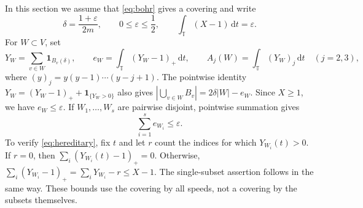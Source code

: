 \documentclass[12pt,leqno]{article}
\numberwithin{equation}{section}
\theoremstyle{remark}
\newcommand{\LRtorus}{\mathbb T}
\newcommand{\LRindicator}{\mathbf 1}
\newcommand{\LRdifferential}{\,\mathrm d}
\begin{document}
In this section we assume that \eqref{eq:bohr} gives a covering and write
\begin{equation}\label{eq:epsilon}
\delta=\frac{1+\varepsilon}{2m},\qquad
0\le\varepsilon\le\frac12,\qquad
\int_\LRtorus(X-1)\LRdifferential t=\varepsilon.
\end{equation}
For $W\subset V$, set
\[
Y_W=\sum_{v\in W}\LRindicator_{B_v(\delta)},\qquad
e_W=\int_\LRtorus(Y_W-1)_+\LRdifferential t,
\qquad A_j(W)=\int_\LRtorus(Y_W)_j\LRdifferential t\quad(j=2,3),
\]
where $(y)_j=y(y-1)\cdots(y-j+1)$. The pointwise identity $Y_W=(Y_W-1)_++\LRindicator_{\{Y_W>0\}}$ also gives $|\bigcup_{v\in W}B_v|=2\delta|W|-e_W$. Since $X\ge1$, we have $e_W\le\varepsilon$. If $W_1,\ldots,W_s$ are pairwise disjoint, pointwise summation gives
\begin{equation}\label{eq:hereditary}
\sum_{i=1}^s e_{W_i}\le\varepsilon.
\end{equation}
To verify \eqref{eq:hereditary}, fix $t$ and let $r$ count the indices for which $Y_{W_i}(t)>0$. If $r=0$, then $\sum_i(Y_{W_i}(t)-1)_+=0$. Otherwise,
$\sum_i(Y_{W_i}-1)_+=\sum_iY_{W_i}-r\le X-1$. The single-subset assertion follows in the same way. These bounds use the covering by all speeds, not a covering by the subsets themselves.
\end{document}

